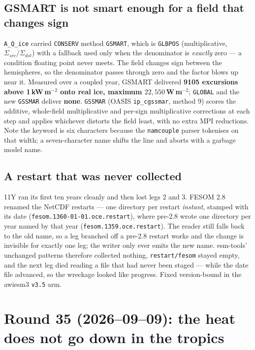 \documentclass[10pt]{article}
\begin{document}
\subsection{GSMART is not smart enough for a field that changes sign}\label{sub:r34gssmar}
\texttt{A\_Q\_ice} carried \texttt{CONSERV} method \texttt{GSMART}, which is
\texttt{GLBPOS} (multiplicative, $\Sigma_{src}/\Sigma_{dst}$) with a fallback used only when
the denominator is \emph{exactly} zero --- a condition floating point never meets. The field
changes sign between the hemispheres, so the denominator passes through zero and the factor
blows up near it. Measured over a coupled year, GSMART delivered \textbf{9105 excursions
above 1\,kW\,m$^{-2}$ onto real ice, maximum $22{,}550$\,W\,m$^{-2}$}; \texttt{GLOBAL} and
the new \texttt{GSSMAR} deliver \textbf{none}. \texttt{GSSMAR} (OASIS \texttt{ip\_cgssmar},
method 9) scores the additive, whole-field multiplicative and per-sign multiplicative
corrections at each step and applies whichever distorts the field least, with no extra MPI
reductions. Note the keyword is six characters because the \texttt{namcouple} parser
tokenises on that width; a seven-character name shifts the line and aborts with a garbage
model name.

\subsection{A restart that was never collected}\label{sub:r34restart}
11Y ran its first ten years cleanly and then lost legs 2 and 3. FESOM 2.8 renamed the
NetCDF restarts --- one directory per restart \emph{instant}, stamped with its date
(\texttt{fesom.1360-01-01.oce.restart}), where pre-2.8 wrote one directory per year named by
that year (\texttt{fesom.1359.oce.restart}). The reader still falls back to the old name, so
a leg branched off a pre-2.8 restart works and the change is invisible for exactly one leg;
the writer only ever emits the new name. esm-tools' unchanged patterns therefore collected
nothing, \texttt{restart/fesom} stayed empty, and the next leg died reading a file that had
never been staged --- while the date file advanced, so the wreckage looked like progress.
Fixed version-bound in the awiesm3 \texttt{v3.5} arm.


\section{Round 35 (2026--09--09): the heat does not go down in the tropics}\label{sec:round35}
\end{document}
